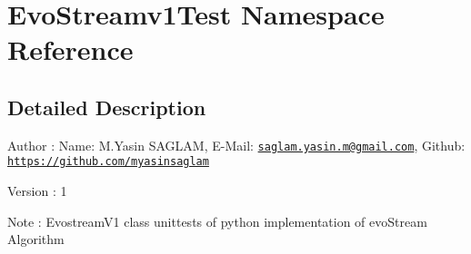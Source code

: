 \hypertarget{namespaceEvoStreamv1Test}{}\section{Evo\+Streamv1\+Test Namespace Reference}
\label{namespaceEvoStreamv1Test}


\subsection{Detailed Description}
\begin{DoxyAuthor}{Author}
\+: Name\+: M.\+Yasin S\+A\+G\+L\+AM, E-\/\+Mail\+: \href{mailto:saglam.yasin.m@gmail.com}{\tt saglam.\+yasin.\+m@gmail.\+com}, Github\+: \href{https://github.com/myasinsaglam}{\tt https\+://github.\+com/myasinsaglam} 
\end{DoxyAuthor}
\begin{DoxyVersion}{Version}
\+: 1 
\end{DoxyVersion}
\begin{DoxyNote}{Note}
\+: Evostream\+V1 class unittests of python implementation of evo\+Stream Algorithm 
\end{DoxyNote}
